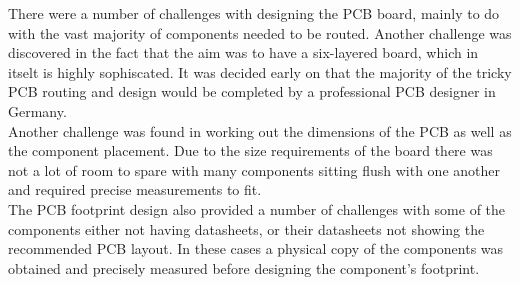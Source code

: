 	There were a number of challenges with designing the PCB board, mainly to do with the vast majority of components needed to be routed. 
Another challenge was discovered in the fact that the aim was to have a six-layered board, which in itselt is highly sophiscated. 
It was decided early on that the majority of the tricky PCB routing and design would be completed by a professional PCB designer in Germany.\\
Another challenge was found in working out the dimensions of the PCB as well as the component placement. 
Due to the size requirements of the board there was not a lot of room to spare with many components sitting flush with one another and required precise measurements to fit. \\
The PCB footprint design also provided a number of challenges with some of the components either not having datasheets, or their datasheets not showing the recommended PCB layout. 
In these cases a physical copy of the components was obtained and precisely measured before designing the component's footprint.






